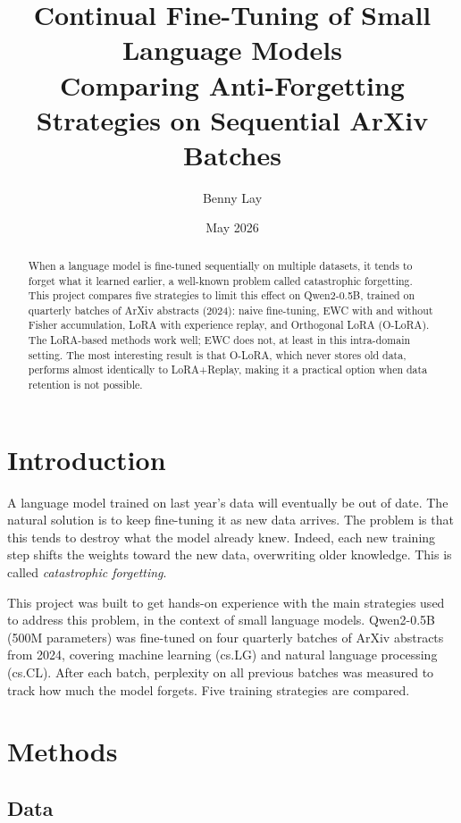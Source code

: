 \documentclass[11pt,a4paper]{article}
\title{\textbf{Continual Fine-Tuning of Small Language Models}\\
\large Comparing Anti-Forgetting Strategies on Sequential ArXiv Batches}
\author{Benny Lay}
\date{May 2026}
\begin{document}
\maketitle

\begin{abstract}
When a language model is fine-tuned sequentially on multiple datasets, it tends to forget what it learned earlier, a well-known problem called catastrophic forgetting. This project compares five strategies to limit this effect on Qwen2-0.5B, trained on quarterly batches of ArXiv abstracts (2024): naive fine-tuning, EWC with and without Fisher accumulation, LoRA with experience replay, and Orthogonal LoRA (O-LoRA). The LoRA-based methods work well; EWC does not, at least in this intra-domain setting. The most interesting result is that O-LoRA, which never stores old data, performs almost identically to LoRA+Replay, making it a practical option when data retention is not possible.
\end{abstract}

\section{Introduction}

A language model trained on last year's data will eventually be out of date. 
The natural solution is to keep fine-tuning it as new data arrives. 
The problem is that this tends to destroy what the model already knew. 
Indeed, each new training step shifts the weights toward the new data, overwriting older knowledge. 
This is called \textit{catastrophic forgetting}.

This project was built to get hands-on experience with the main strategies used to address this problem, in the context of small language models. 
Qwen2-0.5B (500M parameters) was fine-tuned on four quarterly batches of ArXiv abstracts from 2024, covering machine learning (cs.LG) and natural language processing (cs.CL). 
After each batch, perplexity on all previous batches was measured to track how much the model forgets. Five training strategies are compared.

\section{Methods}

\subsection{Data}
\end{document}

